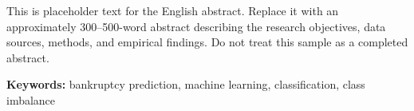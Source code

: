 This is placeholder text for the English abstract. Replace it with an approximately 300--500-word abstract describing the research objectives, data sources, methods, and empirical findings. Do not treat this sample as a completed abstract.

\noindent\textbf{Keywords:} bankruptcy prediction, machine learning, classification, class imbalance
